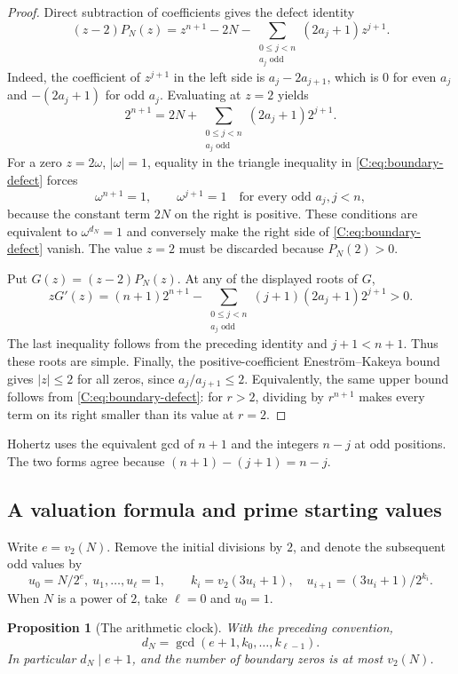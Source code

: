 \documentclass[11pt,a4paper]{article}
\newtheorem{proposition}[theorem]{Proposition}
\theoremstyle{definition}
\theoremstyle{remark}
\numberwithin{equation}{section}
\begin{document}
\begin{proof}
Direct subtraction of coefficients gives the defect identity
\begin{equation}\label{C:eq:boundary-defect}
 (z-2)P_N(z)=z^{n+1}-2N-
 \sum_{\substack{0\le j<n\\a_j\text{ odd}}}(2a_j+1)z^{j+1}.
\end{equation}
Indeed, the coefficient of $z^{j+1}$ in the left side is
$a_j-2a_{j+1}$, which is $0$ for even $a_j$ and $-(2a_j+1)$
for odd $a_j$. Evaluating at $z=2$ yields
\[
 2^{n+1}=2N+
 \sum_{\substack{0\le j<n\\a_j\text{ odd}}}(2a_j+1)2^{j+1}.
\]
For a zero $z=2\omega$, $|\omega|=1$, equality in the triangle
inequality in \eqref{C:eq:boundary-defect} forces
\[
 \omega^{n+1}=1,\qquad
 \omega^{j+1}=1\quad\text{for every odd }a_j, j<n,
\]
because the constant term $2N$ on the right is positive.
These conditions are equivalent to $\omega^{d_N}=1$ and conversely
make the right side of \eqref{C:eq:boundary-defect} vanish.
The value $z=2$ must be discarded because $P_N(2)>0$.

Put $G(z)=(z-2)P_N(z)$. At any of the displayed roots of $G$,
\[
 zG'(z)=(n+1)2^{n+1}
 -\sum_{\substack{0\le j<n\\a_j\text{ odd}}}
 (j+1)(2a_j+1)2^{j+1}>0.
\]
The last inequality follows from the preceding identity and $j+1<n+1$.
Thus these roots are simple. Finally, the positive-coefficient
Enestr\"om--Kakeya bound gives $|z|\le2$ for all zeros, since
$a_j/a_{j+1}\le2$. Equivalently, the same upper bound follows from
\eqref{C:eq:boundary-defect}: for $r>2$, dividing by $r^{n+1}$ makes
every term on its right smaller than its value at $r=2$.
\end{proof}

Hohertz uses the equivalent gcd of $n+1$ and the integers $n-j$ at
odd positions. The two forms agree because $(n+1)-(j+1)=n-j$.

\subsection{A valuation formula and prime starting values}
Write $e=v_2(N)$. Remove the initial divisions by $2$, and denote the
subsequent odd values by
\[
 u_0=N/2^e,\ u_1,\ldots,u_\ell=1,
 \qquad k_i=v_2(3u_i+1),\quad
 u_{i+1}=(3u_i+1)/2^{k_i}.
\]
When $N$ is a power of $2$, take $\ell=0$ and $u_0=1$.

\begin{proposition}[The arithmetic clock]\label{C:prop:boundary-clock}
With the preceding convention,
\[
 \boxed{d_N=\gcd(e+1,k_0,\ldots,k_{\ell-1}).}
\]
In particular $d_N\mid e+1$, and the number of boundary zeros is at most
$v_2(N)$.
\end{proposition}
\end{document}
